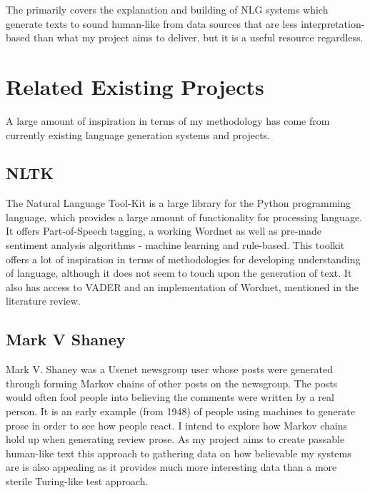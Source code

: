 The primarily covers the explanation and building of NLG systems which generate texts to sound human-like from data sources that are less interpretation-based than what my project aims to deliver, but it is a useful resource regardless.

\section{Related Existing Projects}
A large amount of inspiration in terms of my methodology has come from currently existing language generation systems and projects.
\subsection{NLTK}
The Natural Language Tool-Kit is a large library for the Python programming language, which provides a large amount of functionality for processing language.\cite{NLTK} It offers Part-of-Speech tagging, a working Wordnet as well as pre-made sentiment analysis algorithms - machine learning and rule-based.
This toolkit offers a lot of inspiration in terms of methodologies for developing understanding of language, although it does not seem to touch upon the generation of text. It also has access to VADER and an implementation of Wordnet, mentioned in the literature review.

\subsection{Mark V Shaney}
Mark V. Shaney was a Usenet newsgroup user whose posts were generated through forming Markov chains of other posts on the newsgroup.\cite{MarkVShaney} The posts would often fool people into believing the comments were written by a real person. It is an early example (from 1948) of people using machines to generate prose in order to see how people react. I intend to explore how Markov chains hold up when generating review prose. As my project aims to create passable human-like text this approach to gathering data on how believable my systems are is also appealing as it provides much more interesting data than a more sterile Turing-like test approach.


